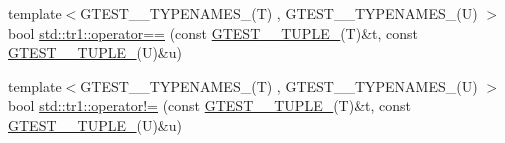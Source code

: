 \begin{DoxyCompactItemize}
\item 
{\footnotesize template$<$G\+T\+E\+S\+T\+\_\+\_\+\+T\+Y\+P\+E\+N\+A\+M\+E\+S\+\_\+(\+T) , G\+T\+E\+S\+T\+\_\+\_\+\+T\+Y\+P\+E\+N\+A\+M\+E\+S\+\_\+(\+U) $>$ }\\bool \hyperlink{namespacestd_1_1tr1_af4516de784404381f9b14797694b6311}{std\+::tr1\+::operator==} (const \hyperlink{gtest-tuple_8h_a275e7bcd84299cc44b9c1dba971951c4}{G\+T\+E\+S\+T\+\_\+\_\+\+T\+U\+P\+L\+E\+\_\+}(T)\&t, const \hyperlink{gtest-tuple_8h_a275e7bcd84299cc44b9c1dba971951c4}{G\+T\+E\+S\+T\+\_\+\_\+\+T\+U\+P\+L\+E\+\_\+}(U)\&u)
\item 
{\footnotesize template$<$G\+T\+E\+S\+T\+\_\+\_\+\+T\+Y\+P\+E\+N\+A\+M\+E\+S\+\_\+(\+T) , G\+T\+E\+S\+T\+\_\+\_\+\+T\+Y\+P\+E\+N\+A\+M\+E\+S\+\_\+(\+U) $>$ }\\bool \hyperlink{namespacestd_1_1tr1_a058882c51de469b5e78d29076f864940}{std\+::tr1\+::operator!=} (const \hyperlink{gtest-tuple_8h_a275e7bcd84299cc44b9c1dba971951c4}{G\+T\+E\+S\+T\+\_\+\_\+\+T\+U\+P\+L\+E\+\_\+}(T)\&t, const \hyperlink{gtest-tuple_8h_a275e7bcd84299cc44b9c1dba971951c4}{G\+T\+E\+S\+T\+\_\+\_\+\+T\+U\+P\+L\+E\+\_\+}(U)\&u)
\end{DoxyCompactItemize}
